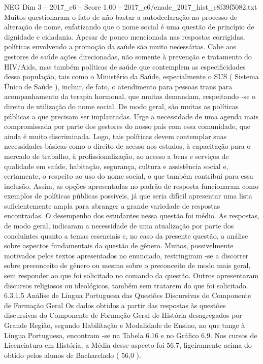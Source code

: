 \begin{textsample}{NEG Dim 3 – 2017\_c6 – Score 1.00 – 2017\_c6/enade\_2017\_hist\_c8f39f5082.txt}
Muitos questionaram o fato de não bastar a autodeclaração no processo de alteração de nome, enfatizando que o nome social é uma questão de princípio de dignidade e cidadania.
Apesar de pouco mencionada nas respostas corrigidas, políticas envolvendo a promoção da saúde são muito necessárias.
Cabe aos gestores de saúde ações direcionadas, não somente à prevenção e tratamento do HIV/Aids, mas também políticas de saúde que contemplem as especificidades dessa população, tais como o Ministério da Saúde, especialmente o SUS ( Sistema Único de Saúde ), incluir, de fato, o atendimento para pessoas trans para acompanhamento da terapia hormonal, que muitas demandam, respeitando -se o direito de utilização do nome social.
De modo geral, são muitas as políticas públicas a que precisam ser implantadas.
Urge a necessidade de uma agenda mais compromissada por parte dos gestores do nosso país com essa comunidade, que ainda é muito discriminada.
Logo, tais políticas devem contemplar suas necessidades básicas como o direito de acesso aos estudos, à capacitação para o mercado de trabalho, à profissionalização, ao acesso a bens e serviços de qualidade em saúde, habitação, segurança, cultura e assistência social e, certamente, o respeito ao uso do nome social, o que também contribui para essa inclusão.
Assim, as opções apresentadas no padrão de resposta funcionaram como exemplos de políticas públicas possíveis, já que seria difícil apresentar uma lista suficientemente ampla para abranger a grande variedade de respostas encontradas.
O desempenho dos estudantes nessa questão foi médio.
As respostas, de modo geral, indicaram a necessidade de uma atualização por parte dos concluintes quanto a temas essenciais e, no caso da presente questão, a análise sobre aspectos fundamentais da questão de gênero.
Muitos, possivelmente motivados pelos textos apresentados no enunciado, restringiram -se a discorrer sobre preconceito de gênero ou mesmo sobre o preconceito de modo mais geral, sem responder ao que foi solicitado no comando da questão.
Outros apresentaram discursos religiosos ou ideológicos, também sem tratarem do que foi solicitado. 6.3.1.5 Análise de Língua Portuguesa das Questões Discursivas do Componente de Formação Geral Os dados obtidos a partir das respostas às questões discursivas do Componente de Formação Geral de História desagregados por Grande Região, segundo Habilitação e Modalidade de Ensino, no que tange à Língua Portuguesa, encontram -se na Tabela 6.16 e no Gráfico 6.9.
Nos cursos de Licenciatura em História, a Média desse aspecto foi 56,7, ligeiramente acima do obtido pelos alunos de Bacharelado ( 56,0 ).

\end{textsample}
